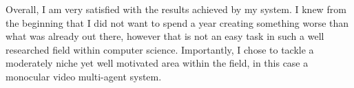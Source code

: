 Overall, I am very satisfied with the results achieved by my system. I knew from the beginning that I did not want to spend a year creating something worse than what was already out there, however that is not an easy task in such a well researched field within computer science. Importantly, I chose to tackle a moderately niche yet well motivated area within the field, in this case a monocular video multi-agent system.